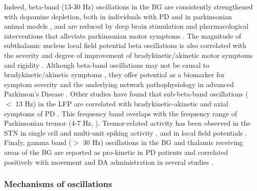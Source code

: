 %
%
%
%
%
%
%
Indeed, beta-band (13-30 Hz) oscillations in the BG are consistently strengthened with
dopamine depletion, both in individuals with PD and in parkinsonian animal models
\cite{sharott_dopamine_2005,mallet_disrupted_2008,kuhn_high-frequency_2008},
and are reduced by deep brain stimulation and pharmacological interventions
that alleviate parkinsonian motor symptoms
\cite{kuhn_reduction_2006,weinberger_beta_2006,eusebio_deep_2011,ray_local_2008}.
The magnitude of subthalamic nucleus local field potential beta oscillations
is also correlated with the severity and degree of improvement of bradykinetic/akinetic
motor symptoms and rigidity \cite{kuhn_reduction_2006,bronte-stewart_stn_2009,neumann_subthalamic_2016}.
Although beta-band oscillations may not be causal to bradykinetic/akinetic
symptoms \cite{leblois_late_2007,syed_oscillatory_2012,devergnas_relationship_2014,pan_neuronal_2016},
they offer potential as a biomarker for symptom severity and the underlying network
pathophysiology in advanced Parkinson's Disease \cite{rosin_closed-loop_2011,little_adaptive_2013}.
%
%
%
Other studies have found that sub-beta-band oscillations ($<$ 13 Hz) in the LFP are correlated with
bradykinetic-akinetic and axial symptoms of PD \cite{sharott_activity_2014,devergnas_relationship_2014}.
%
This frequency band overlaps with the frequency range of Parkinsonian tremor (4-7 Hz,
\cite{koller_tremors_1989,moustafa_motor_2016}). Tremor-related activity has been observed in the
STN in single cell and multi-unit spiking activity \cite{magarinos-ascone_subthalamic_2000,amtage_tremor-correlated_2008},
and in local field potentials \cite{reck_characterisation_2009,tass_causal_2010}.
%
%
%
%
%
%
%
%
%
Finaly, gamma band ($>$ 30 Hz) oscillations in the BG and thalamic receiving areas
of the BG are reported as pro-kinetic in PD patients and correlated positively with
movement and DA administration in several studies \cite{kempf_gamma_2009,kammermeier_effects_2016,devergnas_relationship_2014,brown_dopamine_2001}.
%

%
%
\subsubsection{Mechanisms of oscillations}
\label{sec:ch2-oscillation-mechanisms}
%
%
%
%
%

